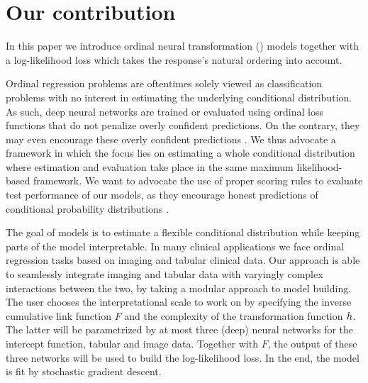 \documentclass[article,nojss,shortnames]{jss}\usepackage[]{graphicx}\usepackage[]{color}
\begin{document}
\section{Our contribution} \label{sec:contrib}

In this paper we introduce ordinal neural transformation () models
together with a log-likelihood loss which takes the response's natural ordering
into account.

Ordinal regression problems are oftentimes solely viewed as classification problems
with no interest in estimating the underlying conditional distribution.
As such, deep neural networks are trained or evaluated using ordinal loss functions
that do not penalize overly confident predictions.
On the contrary, they may even encourage these overly confident predictions
\citep{brocker2007scoring}.
We thus advocate a framework in which the focus lies on estimating a whole
conditional distribution where estimation and evaluation take place in the
same maximum likelihood-based framework. We want to advocate the use
of proper scoring rules to evaluate test performance of our models, as they
encourage honest predictions of conditional probability distributions
\citep{gneiting2007strictly}.

The goal of  models is to estimate a flexible conditional distribution
while keeping parts of the model interpretable. In many clinical applications
we face ordinal regression tasks based on imaging and tabular clinical data.
Our approach is able to seamlessly integrate imaging and tabular data with
varyingly complex interactions between the two, by taking a modular approach to
model building. The user chooses the interpretational scale to work on by
specifying the inverse cumulative link function $F$ and the complexity of the
transformation function $h$. The latter will be parametrized by at most three
(deep) neural networks for the intercept function, tabular and image data.
Together with $F$, the output of these three networks will be used to build the
log-likelihood loss. In the end, the model is fit by stochastic gradient descent.
\end{document}
